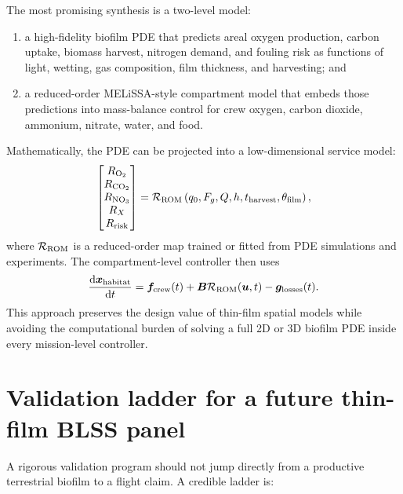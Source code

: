 \documentclass[11pt]{article}
\newcommand{\MEL}{MELiSSA}
\newcommand{\dd}{\mathrm{d}}
\begin{document}
The most promising synthesis is a two-level model:
\begin{enumerate}
  \item a high-fidelity biofilm PDE that predicts areal oxygen production, carbon uptake, biomass harvest, nitrogen demand, and fouling risk as functions of light, wetting, gas composition, film thickness, and harvesting; and
  \item a reduced-order \MEL{}-style compartment model that embeds those predictions into mass-balance control for crew oxygen, carbon dioxide, ammonium, nitrate, water, and food.
\end{enumerate}
Mathematically, the PDE can be projected into a low-dimensional service model:
\begin{equation}
  \begin{bmatrix}
  R_{\ce{O2}}\\R_{\ce{CO2}}\\R_{\ce{NO3}}\\R_X\\R_{\rm risk}
  \end{bmatrix}
  =\mathcal{R}_{\rm ROM}\left(q_0,F_g,Q,h,t_{\rm harvest},\theta_{\rm film}\right),
  \label{eq:rom_projection}
\end{equation}
where $\mathcal{R}_{\rm ROM}$ is a reduced-order map trained or fitted from PDE simulations and experiments. The compartment-level controller then uses
\begin{equation}
  \frac{\dd \bm x_{\rm habitat}}{\dd t}=\bm f_{\rm crew}(t)+\bm B\mathcal{R}_{\rm ROM}(\bm u,t)-\bm g_{\rm losses}(t).
  \label{eq:habitat_coupled}
\end{equation}
This approach preserves the design value of thin-film spatial models while avoiding the computational burden of solving a full 2D or 3D biofilm PDE inside every mission-level controller.

\section{Validation ladder for a future thin-film BLSS panel}

A rigorous validation program should not jump directly from a productive terrestrial biofilm to a flight claim. A credible ladder is:
\end{document}
